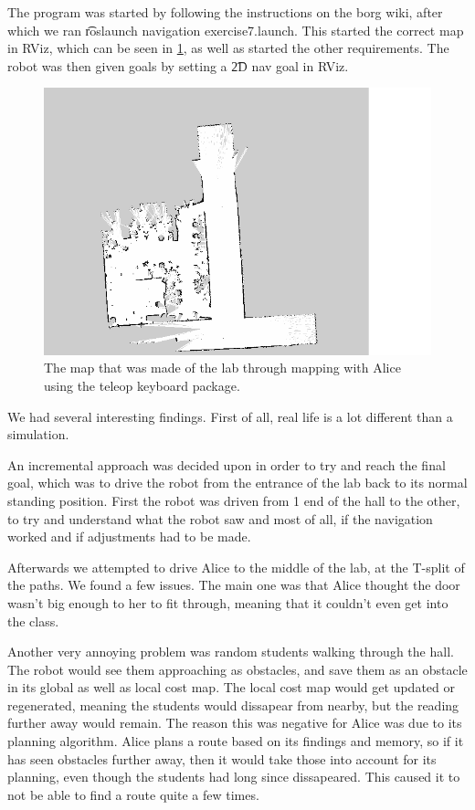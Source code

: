 
The program was started by following the instructions on the borg wiki, after which we ran \t{roslaunch navigation exercise7.launch}. This started the correct map in RViz, which can be seen in \ref{fig:1:map}, as well as started the other requirements. The robot was then given goals by setting a \t{2D nav goal} in RViz.

\begin{figure}[h!]
	\centering
	\includegraphics[width=\textwidth]{./img/real_lab.png}
	\caption{The map that was made of the lab through mapping with Alice using the teleop keyboard package.}
	\label{fig:1:map}
\end{figure}

We had several interesting findings. First of all, real life is a lot different than a simulation.

An incremental approach was decided upon in order to try and reach the final goal, which was to drive the robot from the entrance of the lab back to its normal standing position. First the robot was driven from 1 end of the hall to the other, to try and understand what the robot saw and most of all, if the navigation worked and if adjustments had to be made. 

Afterwards we attempted to drive Alice to the middle of the lab, at the T-split of the paths. We found a few issues. The main one was that Alice thought the door wasn't big enough to her to fit through, meaning that it couldn't even get into the class. 

Another very annoying problem was random students walking through the hall. The robot would see them approaching as obstacles, and save them as an obstacle in its global as well as local cost map. The local cost map would get updated or regenerated, meaning the students would dissapear from nearby, but the reading further away would remain. The reason this was negative for Alice was due to its planning algorithm. Alice plans a route based on its findings and memory, so if it has seen obstacles further away, then it would take those into account for its planning, even though the students had long since dissapeared. This caused it to not be able to find a route quite a few times.


